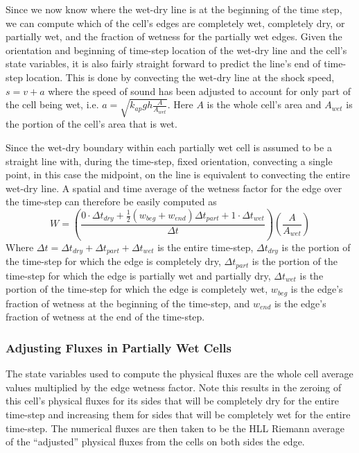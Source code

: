 \documentclass[letterpaper,10pt]{article}
\begin{document}
Since we now know where the wet-dry line is at the beginning of the 
time step, we can compute which of the cell's edges are completely 
wet, completely dry, or partially wet, and the fraction of wetness for 
the partially wet edges.  Given the orientation and beginning of 
time-step location of the wet-dry line and the cell's state variables, 
it is also fairly straight forward to predict the line's end of 
time-step location.  This is done by convecting the wet-dry line at 
the shock speed, $s=v+a$ where the speed of sound has been adjusted 
to account for only part of the cell being wet, i.e. 
$a=\sqrt{k_{ap}gh\frac{A}{A_{wet}}}$.  Here $A$ is the whole cell's 
area and $A_{wet}$ is the portion of the cell's area that is wet.  \newline

Since the wet-dry boundary within each partially wet cell is assumed 
to be a straight line with, during the time-step, fixed orientation, 
convecting a single point, in this case the midpoint, on the line is 
equivalent to convecting the entire wet-dry line.  A spatial and time 
average of the wetness factor for the edge over the time-step can 
therefore be easily computed as
\begin{equation}
	W=\left(\frac{0\cdot\Delta t_{dry} +\frac{1}{2}(w_{beg}+w_{end})\Delta t_{part}+1\cdot\Delta t_{wet}}{\Delta t}\right) \left(\frac{A}{A_{wet}}\right)
	\label{wetnessfactor}
\end{equation}
Where $\Delta t=\Delta t_{dry}+\Delta t_{part}+\Delta t_{wet}$ is the 
entire time-step, $\Delta t_{dry}$ is the portion of the time-step for 
which the edge is completely dry, $\Delta t_{part}$ is the portion of 
the time-step for which the edge is partially wet and partially dry, 
$\Delta t_{wet}$ is the portion of the time-step for which the edge is 
completely wet, $w_{beg}$ is the edge's fraction of wetness at the 
beginning of the time-step, and $w_{end}$ is the edge's fraction of 
wetness at the end of the time-step.\newline

\subsubsection{Adjusting Fluxes in Partially Wet Cells} \label{adjustfluxes}

The state variables used to compute the physical fluxes are the whole
cell average values multiplied by the edge wetness factor.  Note this 
results in the zeroing of this cell's physical fluxes for its sides 
that will be completely dry for the entire time-step and increasing 
them for sides that will be completely wet for the entire time-step.   
The numerical fluxes are then taken to be the HLL Riemann average of 
the ``adjusted'' physical fluxes from the cells on both sides the edge.  \newline
\end{document}
